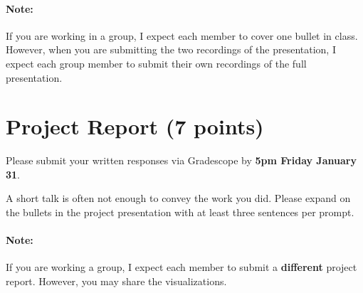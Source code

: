 \documentclass{article}
\begin{document}
\paragraph{Note:} If you are working in a group, I expect each member to
cover one bullet in class.
However, when you are submitting the two recordings of the presentation,
I expect each group member to submit their own recordings of the full
presentation.

\section{Project Report (7 points)}
Please submit your written responses via Gradescope
by \textbf{5pm Friday January 31}.

A short talk is often not enough to convey the work you did.
Please expand on the bullets in the project presentation with
at least three sentences per prompt.

\paragraph{Note:} If you are working a group, I expect each member to submit
a \textbf{different} project report. However, you may share the visualizations.
\end{document}
